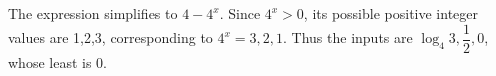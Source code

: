 The expression simplifies to $4-4^x$. Since $4^x>0$, its possible positive integer values are 1,2,3, corresponding to $4^x=3,2,1$. Thus the inputs are $\log_4 3,\dfrac{1}{2},0$, whose least is $\boxed0$.
